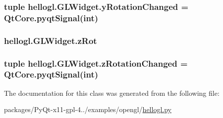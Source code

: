 \subsubsection[{y\+Rotation\+Changed}]{\setlength{\rightskip}{0pt plus 5cm}tuple hellogl.\+G\+L\+Widget.\+y\+Rotation\+Changed = Qt\+Core.\+pyqt\+Signal(int)\hspace{0.3cm}{\ttfamily [static]}}\label{classhellogl_1_1GLWidget_a00f0186cc97df3ecff3576cd7fcfe938}
\hypertarget{classhellogl_1_1GLWidget_a5360490bcccd77eac45048c5141670ae}{}
\subsubsection[{z\+Rot}]{\setlength{\rightskip}{0pt plus 5cm}hellogl.\+G\+L\+Widget.\+z\+Rot}\label{classhellogl_1_1GLWidget_a5360490bcccd77eac45048c5141670ae}
\hypertarget{classhellogl_1_1GLWidget_a048e6dbdc30d5d87b571f066ce3592c8}{}
\subsubsection[{z\+Rotation\+Changed}]{\setlength{\rightskip}{0pt plus 5cm}tuple hellogl.\+G\+L\+Widget.\+z\+Rotation\+Changed = Qt\+Core.\+pyqt\+Signal(int)\hspace{0.3cm}{\ttfamily [static]}}\label{classhellogl_1_1GLWidget_a048e6dbdc30d5d87b571f066ce3592c8}


The documentation for this class was generated from the following file\+:\begin{DoxyCompactItemize}
\item 
packages/\+Py\+Qt-\/x11-\/gpl-\/4../examples/opengl/\hyperlink{hellogl_8py}{hellogl.\+py}\end{DoxyCompactItemize}
